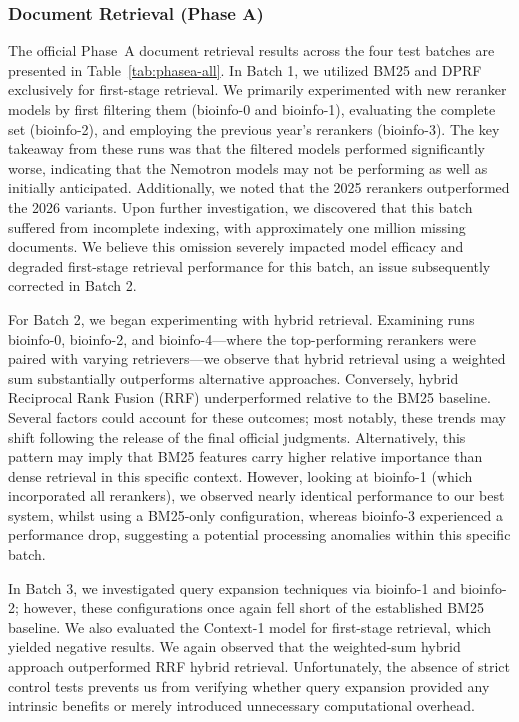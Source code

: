 \subsubsection{Document Retrieval (Phase A)}
\label{sec:results-phase-a}
The official Phase~A document retrieval results across the four test batches are presented in Table~\ref{tab:phasea-all}. In Batch 1, we utilized BM25 and DPRF exclusively for first-stage retrieval. We primarily experimented with new reranker models by first filtering them (bioinfo-0 and bioinfo-1), evaluating the complete set (bioinfo-2), and employing the previous year's rerankers (bioinfo-3). The key takeaway from these runs was that the filtered models performed significantly worse, indicating that the Nemotron models may not be performing as well as initially anticipated. Additionally, we noted that the 2025 rerankers outperformed the 2026 variants. Upon further investigation, we discovered that this batch suffered from incomplete indexing, with approximately one million missing documents. We believe this omission severely impacted model efficacy and degraded first-stage retrieval performance for this batch, an issue subsequently corrected in Batch 2.

For Batch 2, we began experimenting with hybrid retrieval. Examining runs bioinfo-0, bioinfo-2, and bioinfo-4—where the top-performing rerankers were paired with varying retrievers—we observe that hybrid retrieval using a weighted sum substantially outperforms alternative approaches. Conversely, hybrid Reciprocal Rank Fusion (RRF) underperformed relative to the BM25 baseline. Several factors could account for these outcomes; most notably, these trends may shift following the release of the final official judgments. Alternatively, this pattern may imply that BM25 features carry higher relative importance than dense retrieval in this specific context. However, looking at bioinfo-1 (which incorporated all rerankers), we observed nearly identical performance to our best system, whilst using a BM25-only configuration, whereas bioinfo-3 experienced a performance drop, suggesting a potential processing anomalies within this specific batch.

In Batch 3, we investigated query expansion techniques via bioinfo-1 and bioinfo-2; however, these configurations once again fell short of the established BM25 baseline. We also evaluated the Context-1 model for first-stage retrieval, which yielded negative results. We again observed that the weighted-sum hybrid approach outperformed RRF hybrid retrieval. Unfortunately, the absence of strict control tests prevents us from verifying whether query expansion provided any intrinsic benefits or merely introduced unnecessary computational overhead.

